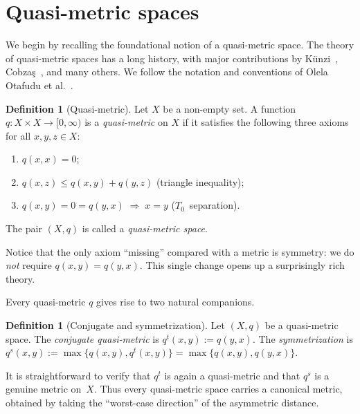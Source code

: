 \documentclass[11pt,a4paper]{article}
\theoremstyle{plain}
\theoremstyle{definition}
\newtheorem{definitioninner}[theoreminner]{Definition}
\newenvironment{definition}[1][]{\begin{definitioninner}[#1]}{\end{definitioninner}}
\begin{document}
\section{Quasi-metric spaces}
\label{sec:quasi-metric}

We begin by recalling the foundational notion of a quasi-metric space.
The theory of quasi-metric spaces has a long history, with major
contributions by K\"unzi~\cite{kunzi1995, kunzi2001},
Cobza\c{s}~\cite{cobzas2013}, and many others.  We follow the
notation and conventions of Olela Otafudu et
al.~\cite{olela2024}.

\begin{definition}[Quasi-metric]\label{def:quasi-metric}
Let $X$ be a non-empty set.  A function
$q\colon X\times X\to[0,\infty)$ is a \emph{quasi-metric} on $X$
if it satisfies the following three axioms for all $x,y,z\in X$:
\begin{enumerate}[label=\textup{(Q\arabic*)},leftmargin=3em]
    \item $q(x,x)=0$; \label{Q1}
    \item $q(x,z)\le q(x,y)+q(y,z)$ \quad(triangle inequality); \label{Q2}
    \item $q(x,y)=0=q(y,x)\;\Rightarrow\;x=y$
      \quad($T_0$~separation). \label{Q3}
\end{enumerate}
The pair $(X,q)$ is called a \emph{quasi-metric space}.
\end{definition}

Notice that the only axiom ``missing'' compared with a metric is
symmetry: we do \emph{not} require $q(x,y)=q(y,x)$.  This single
change opens up a surprisingly rich theory.

Every quasi-metric $q$ gives rise to two natural companions.

\begin{definition}[Conjugate and symmetrization]\label{def:conjugate}
Let $(X,q)$ be a quasi-metric space.  The \emph{conjugate
quasi-metric} is $q^t(x,y):=q(y,x)$.  The \emph{symmetrization} is
$q^s(x,y):=\max\{q(x,y),q^t(x,y)\}=\max\{q(x,y),q(y,x)\}$.
\end{definition}

It is straightforward to verify that $q^t$ is again a quasi-metric
and that $q^s$ is a genuine metric on~$X$.  Thus every quasi-metric
space carries a canonical metric, obtained by taking the ``worst-case
direction'' of the asymmetric distance.
\end{document}
